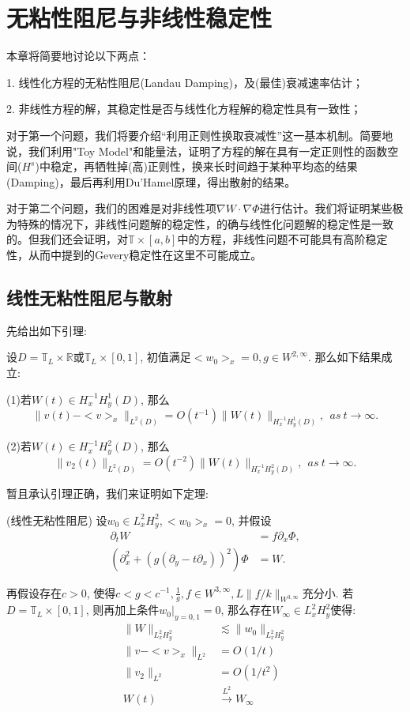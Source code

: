 ﻿
\chapter{无粘性阻尼与非线性稳定性}
本章将简要地讨论以下两点：

1. 线性化方程的无粘性阻尼(Landau Damping)，及(最佳)衰减速率估计；

2. 非线性方程的解，其稳定性是否与线性化方程解的稳定性具有一致性；

对于第一个问题，我们将要介绍“利用正则性换取衰减性”这一基本机制。简要地说，我们利用"Toy Model"和能量法，证明了方程的解在具有一定正则性的函数空间($H^s$)中稳定，再牺牲掉(高)正则性，换来长时间趋于某种平均态的结果(Damping)，最后再利用Du'Hamel原理，得出散射的结果。

对于第二个问题，我们的困难是对非线性项$\nabla W\cdot\nabla \Phi$进行估计。我们将证明某些极为特殊的情况下，非线性问题解的稳定性，的确与线性化问题解的稳定性是一致的。但我们还会证明，对$\mathbb{T}\times [a,b]$中的方程，非线性问题不可能具有高阶稳定性，从而\citep{BM15}中提到的Gevery稳定性在这里不可能成立。


\section{线性无粘性阻尼与散射}

先给出如下引理:

\begin{lem} \songti\rm 设$D=\mathbb{T}_L\times\mathbb{R}$或$\mathbb{T}_L\times [0,1]$, 初值满足$<w_0>_x=0,g\in W^{2,\infty}$. 那么如下结果成立:

(1)若$W(t)\in H_x^{-1}H_y^1(D)$, 那么$$\|v(t)-<v>_x\|_{L^2(D)}=O(t^{-1})\|W(t)\|_{H_x^{-1}H_y^1(D)},~~as~t\rightarrow\infty.$$

(2)若$W(t)\in H_x^{-1}H_y^2(D)$, 那么$$\|v_2(t)\|_{L^2(D)}=O(t^{-2})\|W(t)\|_{H_x^{-1}H_y^2(D)},~~as~t\rightarrow\infty.$$
\end{lem}

暂且承认引理正确，我们来证明如下定理:

\begin{thm}
\songti\rm (线性无粘性阻尼) 设$w_0\in L_x^2H_y^2,<w_0>_x=0$, 并假设
\[
\begin{aligned}
\partial_t W&=f\partial_x \Phi, \\
(\partial_x^2+(g(\partial_y-t\partial_x))^2)\Phi&=W. 
\end{aligned}
\]

再假设存在$c>0$, 使得$c<g<c^{-1}, \frac{1}{g},f\in W^{3,\infty},L\|f/k\|_{W^{3,\infty}}$充分小. 若$D=\mathbb{T}_L\times[0,1]$, 则再加上条件$w_0|_{y=0,1}=0$, 那么存在$W_{\infty}\in L_x^2H_y^2$使得:
\[
\begin{aligned}
\|W\|_{L_x^2H_y^2}&\lesssim\|w_0\|_{L_x^2H_y^2} \\
\|v-<v>_x\|_{L^2}&=O(1/t) \\
\|v_2\|_{L^2}&=O(1/t^2) \\
W(t)&\xrightarrow{L^2}W_{\infty}
\end{aligned}
\]
\end{thm}


